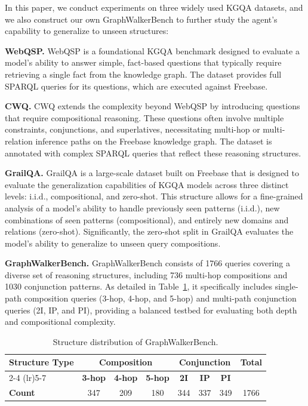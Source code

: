In this paper, we conduct experiments on three widely used 
KGQA datasets, and we also construct our own GraphWalkerBench to further study the agent's capability to generalize to unseen structures: 

\textbf{WebQSP.} WebQSP is a foundational KGQA benchmark designed to evaluate a model’s ability to answer simple, fact-based questions that typically require retrieving a single fact from the knowledge graph. The dataset provides full SPARQL queries for its questions, which are executed against Freebase.

\textbf{CWQ.} CWQ extends the complexity beyond WebQSP by introducing questions that require compositional reasoning. These questions often involve multiple constraints, conjunctions, and superlatives, necessitating multi-hop or multi-relation inference paths on the Freebase knowledge graph.
The dataset is annotated with complex SPARQL queries that reflect these reasoning structures.

\textbf{GrailQA.} GrailQA is a large-scale dataset built on Freebase that is designed to evaluate the generalization capabilities of KGQA models across three distinct levels: i.i.d., compositional, and zero-shot. This structure allows for a fine-grained analysis of a model’s ability to handle previously seen patterns (i.i.d.), new combinations of seen patterns (compositional), and entirely new domains and relations (zero-shot).
Significantly, the zero-shot split in GrailQA evaluates the model’s ability to generalize to unseen query compositions. 




\textbf{GraphWalkerBench.}
GraphWalkerBench consists of 1766 queries covering a diverse set of reasoning 
structures, including 736 multi-hop compositions and 1030 conjunction patterns. 
As detailed in Table~\ref{tab:graphwalkerbench}, it specifically includes 
single-path composition queries (3-hop, 4-hop, and 5-hop) and multi-path 
conjunction queries (2I, IP, and PI), providing a balanced testbed for 
evaluating both depth and compositional complexity.

\begin{table}[htbp]
  \centering
  \small
  \setlength{\tabcolsep}{8pt}
  \caption{Structure distribution of GraphWalkerBench.}
  \label{tab:graphwalkerbench}
  \begin{tabular}{l ccc ccc c}
    \toprule
    \multirow{2}{*}{\textbf{Structure Type}} & \multicolumn{3}{c}{\textbf{Composition}} & \multicolumn{3}{c}{\textbf{Conjunction}} & \multirow{2}{*}{\textbf{Total}} \\
    \cmidrule(lr){2-4} \cmidrule(lr){5-7}
    & \textbf{3-hop} & \textbf{4-hop} & \textbf{5-hop} & \textbf{2I} & \textbf{IP} & \textbf{PI} & \\
    \midrule
    \textbf{Count} & 347 & 209 & 180 & 344 & 337 & 349 & 1766 \\
    \bottomrule
  \end{tabular}
\end{table}



